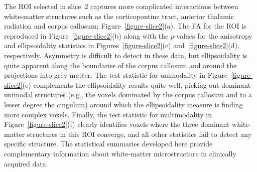 \documentclass[dvips,aoas,preprint]{imsart}
\numberwithin{equation}{section}
\theoremstyle{plain}
\begin{document}
The ROI selected in slice~2 captures more complicated interactions
between white-matter structures such as the corticopontine tract,
anterior thalamic radiation and corpus callosum;
Figure~\ref{figure-slice2}(a).  The FA for the ROI is reproduced in
Figure~\ref{figure-slice2}(b) along with the $p$-values for the
anisotropy and ellipsoidality statistics in
Figures~\ref{figure-slice2}(c) and~\ref{figure-slice2}(d),
respectively.  Asymmetry is difficult to detect in these data, but
ellipsoidality is quite apparent along the boundaries of the corpus
callosum and around the projections into grey matter.  The test
statistic for unimodality in Figure~\ref{figure-slice2}(e) complements
the ellipsoidality results quite well, picking out dominant unimodal
structures (e.g., the voxels dominated by the corpus callosum and to a
lesser degree the cingulum) around which the ellipsoidality measure is
finding more complex voxels.  Finally, the test statistic for
multimodality in Figure~\ref{figure-slice2}(f) clearly identifies
voxels where the three dominant white-matter structures in this ROI
converge, and all other statistics fail to detect any specific
structure.  The statistical summaries developed here provide
complementary information about white-matter microstructure in
clinically acquired data.
\end{document}
